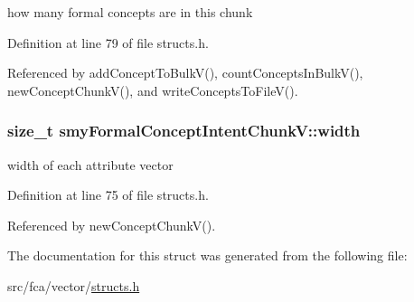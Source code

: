 how many formal concepts are in this chunk 



\-Definition at line 79 of file structs.\-h.



\-Referenced by add\-Concept\-To\-Bulk\-V(), count\-Concepts\-In\-Bulk\-V(), new\-Concept\-Chunk\-V(), and write\-Concepts\-To\-File\-V().

\hypertarget{structsmyFormalConceptIntentChunkV_a34213d18382955bee724884cd2bfd82c}{
\subsubsection[{width}]{\setlength{\rightskip}{0pt plus 5cm}size\-\_\-t {\bf smy\-Formal\-Concept\-Intent\-Chunk\-V\-::width}}}\label{structsmyFormalConceptIntentChunkV_a34213d18382955bee724884cd2bfd82c}


width of each attribute vector 



\-Definition at line 75 of file structs.\-h.



\-Referenced by new\-Concept\-Chunk\-V().



\-The documentation for this struct was generated from the following file\-:\begin{DoxyCompactItemize}
\item 
src/fca/vector/\hyperlink{vector_2structs_8h}{structs.\-h}\end{DoxyCompactItemize}
